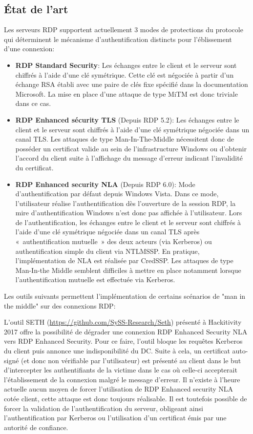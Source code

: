 \subsection{État de l'art}
Les serveurs RDP supportent actuellement 3 modes de protections du protocole qui déterminent le m\'ecanisme d'authentification distincts pour l'\'eblissement d'une connexion:
\begin{itemize}
\item \textbf{RDP Standard Security}: Les \'echanges entre le client et le serveur sont chiffrés à l'aide d'une clé symétrique. Cette clé est négociée à partir d'un échange RSA établi avec une paire de clés fixe spécifié dans la documentation Microsoft. La mise en place d'une attaque de type MiTM est donc triviale dans ce cas.
\item \textbf{RDP Enhanced s\'ecurity TLS} (Depuis RDP 5.2): Les échanges entre le client et le serveur sont chiffrés à l'aide d'une clé symétrique négociée dans un canal TLS. Les attaques de type Man-In-The-Middle nécessitent donc de posséder un certificat valide au sein de l'infrastructure Windows ou d'obtenir l'accord du client suite à l'affichage du message d'erreur indicant l'invalidité du certificat.  
\item \textbf{RDP Enhanced security NLA} (Depuis RDP 6.0): Mode d'authentification par d\'efaut depuis Windows Vista. Dans ce mode, l'utilisateur réalise l'authentification dès l'ouverture de la session RDP, la mire d'authentification Windows n'est donc pas affichée à l'utilisateur. Lors de l'authentification, les échanges entre le client et le serveur sont chiffrés à l'aide d'une clé symétrique négociée dans un canal TLS après « authentification mutuelle » des deux acteurs (via Kerberos) ou authentification simple du client via  NTLMSSP. En pratique, l'implémentation de NLA est réalisée par CredSSP. Les attaques de type Man-In-the Middle semblent difficiles à mettre en place notamment lorsque l’authentification mutuelle est effectuée via Kerberos.
\end{itemize}




Les outils suivants permettent l'impl\'ementation de certains scénarios de "man in the middle" sur des connexions RDP:

L’outil SETH (\url{https://github.com/SySS-Research/Seth}) pr\'esenté à Hackitivity 2017 offre la possibilité de dégrader une connexion RDP Enhanced Security NLA vers RDP Enhanced Security. Pour ce faire, l’outil bloque les requêtes Kerberos du client puis annonce une indisponibilité du DC. Suite à cela, un certificat auto-signé (et donc non vérifiable par l'utilisateur)  est présenté au client dans le but d’intercepter les authentifiants de la victime dans le cas où celle-ci accepterait l’établissement de la connexion malgré le message d'erreur. Il n’existe à l’heure actuelle aucun moyen de forcer l’utilisation de RDP Enhanced security NLA cotée client, cette attaque est donc toujours réalisable. Il est toutefois possible de forcer la validation de l'authentification du serveur, obligeant ainsi l'authentification par Kerberos ou l'utilisation d'un certificat émis par une autorité de confiance.

